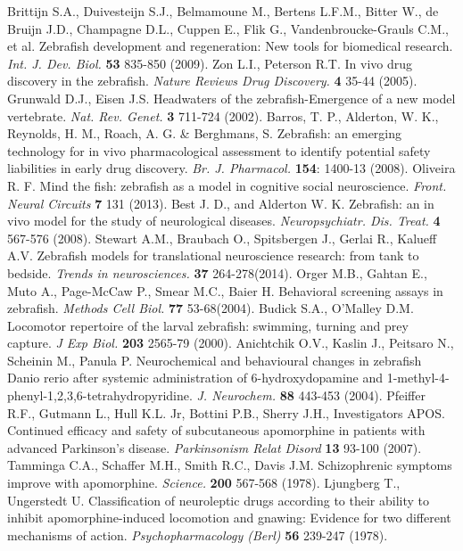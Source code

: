 \documentclass[a4paper,12pt]{article}
\begin{document}
\begin{thebibliography}{99}
Brittijn S.A., Duivesteijn S.J., Belmamoune M., Bertens L.F.M., Bitter W., de Bruijn J.D., Champagne D.L., Cuppen E., Flik G., Vandenbroucke-Grauls C.M., et al. Zebrafish development and regeneration: New tools for biomedical research. \textit{Int. J. Dev. Biol.} \textbf{53} 835-850 (2009).
Zon L.I., Peterson R.T. In vivo drug discovery in the zebrafish. \textit{Nature Reviews Drug Discovery.} \textbf{4} 35-44 (2005).
Grunwald D.J., Eisen J.S. Headwaters of the zebrafish-Emergence of a new model vertebrate. \textit{Nat. Rev. Genet.} \textbf{3} 711-724 (2002).
Barros, T. P., Alderton, W. K., Reynolds, H. M., Roach, A. G. \& Berghmans, S. Zebrafish: an emerging technology for 
in vivo pharmacological assessment to identify potential safety liabilities in early drug discovery. \textit{Br. J. Pharmacol.}
\textbf{154}: 1400-13 (2008).
Oliveira R. F. Mind the fish: zebrafish as a model in cognitive social neuroscience. \textit{Front. Neural Circuits} \textbf{7} 131 (2013).
Best J. D., and Alderton W. K. Zebrafish: an in vivo model for the study of neurological diseases. \textit{Neuropsychiatr. Dis. Treat.}
\textbf{4} 567-576 (2008).
Stewart A.M., Braubach O., Spitsbergen J., Gerlai R., Kalueff A.V. Zebrafish models for translational neuroscience research: from tank to bedside. \textit{Trends in neurosciences.} \textbf{37} 264-278(2014).
Orger M.B., Gahtan E., Muto A., Page-McCaw P., Smear M.C., Baier H. Behavioral screening assays in zebrafish. \textit{Methods Cell Biol.} \textbf{77} 53-68(2004).
Budick S.A., O’Malley D.M. Locomotor repertoire of the larval zebrafish: swimming, turning and prey capture. \textit{J Exp Biol.} \textbf{203} 2565-79 (2000).
Anichtchik O.V., Kaslin J., Peitsaro N., Scheinin M., Panula P. Neurochemical and behavioural changes in zebrafish Danio rerio after systemic administration of 6-hydroxydopamine and 1-methyl-4-phenyl-1,2,3,6-tetrahydropyridine. \textit{J. Neurochem.} \textbf{88} 443-453 (2004). 
Pfeiffer R.F., Gutmann L., Hull K.L. Jr, Bottini P.B., Sherry J.H., Investigators APOS. Continued efficacy and safety of subcutaneous apomorphine in patients with advanced Parkinson's disease. \textit{Parkinsonism Relat Disord} \textbf{13} 93-100 (2007).
Tamminga C.A., Schaffer M.H., Smith R.C., Davis J.M. Schizophrenic symptoms improve with apomorphine. \textit{Science.} \textbf{200} 567-568 (1978).
Ljungberg T., Ungerstedt U. Classification of neuroleptic drugs according to their ability to inhibit apomorphine-induced locomotion and gnawing: Evidence for two different mechanisms of action. \textit{Psychopharmacology (Berl)} \textbf{56} 239-247 (1978). 


\end{thebibliography}
\end{document}
